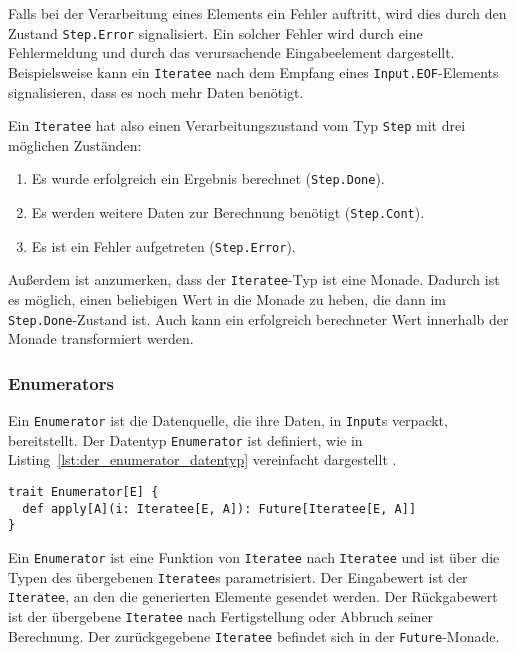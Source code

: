 \documentclass[draft=false
              ,paper=a4
              ,twoside=false
              ,fontsize=11pt
              ,headsepline
              ,BCOR10mm
              ,DIV11
              ]{scrbook}
\begin{document}
Falls bei der Verarbeitung eines Elements ein Fehler auftritt, wird dies durch den Zustand \lstinline|Step.Error| signalisiert.
Ein solcher Fehler wird durch eine Fehlermeldung und durch das verursachende Eingabeelement dargestellt.
Beispielsweise kann ein \lstinline|Iteratee| nach dem Empfang eines \lstinline|Input.EOF|-Elements signalisieren, dass es noch mehr Daten benötigt.

Ein \lstinline|Iteratee| hat also einen Verarbeitungszustand vom Typ \lstinline|Step| mit drei möglichen Zuständen:
\begin{enumerate}
  \item Es wurde erfolgreich ein Ergebnis berechnet (\lstinline|Step.Done|).
  \item Es werden weitere Daten zur Berechnung benötigt (\lstinline|Step.Cont|).
  \item Es ist ein Fehler aufgetreten (\lstinline|Step.Error|).
\end{enumerate}

Außerdem ist anzumerken, dass der \lstinline|Iteratee|-Typ ist eine Monade.
Dadurch ist es möglich, einen beliebigen Wert in die Monade zu heben, die dann im \lstinline|Step.Done|-Zustand ist.
Auch kann ein erfolgreich berechneter Wert innerhalb der Monade transformiert werden.



\subsubsection{Enumerators} %
\label{ssub:design_enumerators}

Ein \lstinline|Enumerator| ist die Datenquelle, die ihre Daten, in \lstinline|Input|s verpackt, bereitstellt.
Der Datentyp \lstinline|Enumerator| ist definiert, wie in Listing~\ref{lst:der_enumerator_datentyp} vereinfacht dargestellt \cite[vgl.][]{play_enumerator_source_code}.
\begin{lstlisting}[caption=Der Enumerator-Datentyp, label=lst:der_enumerator_datentyp]
trait Enumerator[E] {
  def apply[A](i: Iteratee[E, A]): Future[Iteratee[E, A]]
}
\end{lstlisting}

Ein \lstinline|Enumerator| ist eine Funktion von \lstinline|Iteratee| nach \lstinline|Iteratee| und ist über die Typen des übergebenen \lstinline|Iteratee|s parametrisiert.
Der Eingabewert ist der \lstinline|Iteratee|, an den die generierten Elemente gesendet werden.
Der Rückgabewert ist der übergebene \lstinline|Iteratee| nach Fertigstellung oder Abbruch seiner Berechnung.
Der zurückgegebene \lstinline|Iteratee| befindet sich in der \lstinline|Future|-Monade.
\end{document}
